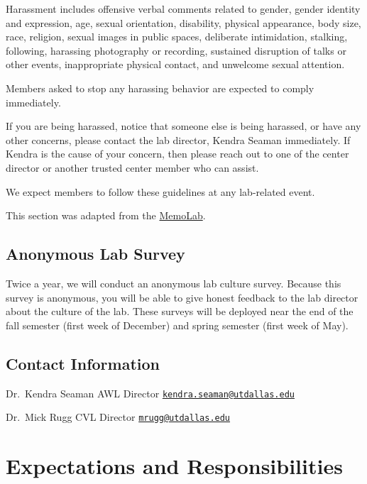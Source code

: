 \documentclass[]{book}
\begin{document}
Harassment includes offensive verbal comments related to gender, gender identity and expression, age, sexual orientation, disability, physical appearance, body size, race, religion, sexual images in public spaces, deliberate intimidation, stalking, following, harassing photography or recording, sustained disruption of talks or other events, inappropriate physical contact, and unwelcome sexual attention.

Members asked to stop any harassing behavior are expected to comply immediately.

If you are being harassed, notice that someone else is being harassed, or have any other concerns, please contact the lab director, Kendra Seaman immediately. If Kendra is the cause of your concern, then please reach out to one of the center director or another trusted center member who can assist.

We expect members to follow these guidelines at any lab-related event.

This section was adapted from the \href{https://github.com/memobc/memolab-manual\#code-of-conduct}{MemoLab}.

\hypertarget{anonymous-lab-survey}{%
\section{Anonymous Lab Survey}\label{anonymous-lab-survey}}

Twice a year, we will conduct an anonymous lab culture survey. Because this survey is anonymous, you will be able to give honest feedback to the lab director about the culture of the lab. These surveys will be deployed near the end of the fall semester (first week of December) and spring semester (first week of May).

\hypertarget{contact-information}{%
\section{Contact Information}\label{contact-information}}

Dr.~Kendra Seaman
AWL Director
\href{mailto:kendra.seaman@utdallas.edu}{\nolinkurl{kendra.seaman@utdallas.edu}}

Dr.~Mick Rugg
CVL Director
\href{mailto:mrugg@utdallas.edu}{\nolinkurl{mrugg@utdallas.edu}}

\hypertarget{expectations-and-responsibilities}{%
\chapter{Expectations and Responsibilities}\label{expectations-and-responsibilities}}
\end{document}
